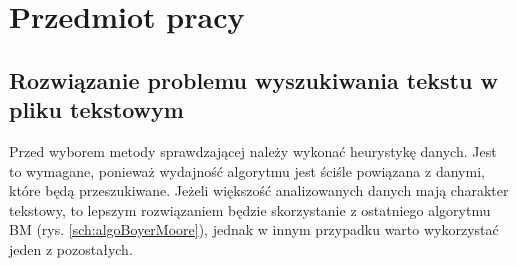 \chapter{Przedmiot pracy}



\section{Rozwiązanie problemu wyszukiwania tekstu w pliku tekstowym}

Przed wyborem metody sprawdzającej należy wykonać heurystykę danych. Jest to 
wymagane, ponieważ wydajność algorytmu jest ściśle powiązana z danymi, które
będą przeszukiwane. Jeżeli większość analizowanych danych mają charakter
tekstowy, to lepszym rozwiązaniem będzie skorzystanie z ostatniego algorytmu BM
(rys. \ref{sch:algoBoyerMoore}), jednak w innym przypadku warto wykorzystać jeden z 
pozostałych.

